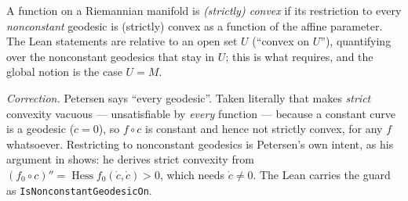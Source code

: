 \begin{definition}
  \label{def:pet-ch6-convex-function}
  \leanok
  A function on a Riemannian manifold is \emph{(strictly) convex} if its
  restriction to every \emph{nonconstant} geodesic is (strictly) convex as a
  function of the affine parameter. The Lean statements are relative to an open
  set $U$ (``convex on $U$''), quantifying over the nonconstant geodesics that
  stay in $U$; this is what 
  requires, and the global notion is the case $U=M$.

  \emph{Correction.} Petersen says ``every geodesic''. Taken literally that
  makes \emph{strict} convexity vacuous --- unsatisfiable by \emph{every}
  function --- because a constant curve is a geodesic ($\ddot c=0$), so
  $f\circ c$ is constant and hence not strictly convex, for any $f$ whatsoever.
  Restricting to nonconstant geodesics is Petersen's own intent, as his
  argument in  shows: he derives
  strict convexity from $(f_0\circ c)''=\operatorname{Hess}f_0(\dot c,\dot c)>0$,
  which needs $\dot c\neq0$. The Lean carries the guard as
  \texttt{IsNonconstantGeodesicOn}.
\end{definition}

